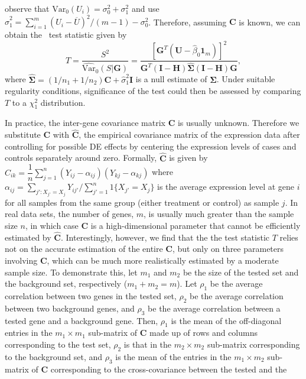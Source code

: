 	observe
	that $\mbox{Var}_{0}(U_i)=\sigma_0^2+\sigma_1^2$ and use
	$\hat\sigma_1^2=\sum_{i=1}^m(U_i-\overline{U})^2/(m-1)-\sigma_0^2$. Therefore, assuming $\bm C$ 
	is
	known, we can obtain the \OurMethod~test statistic given by
	\begin{equation}\label{eq:meqleastat}
	T = \dfrac{S^2}{\widehat{\mbox{Var}}_{0}(S|\bm G)} = \dfrac{[\bm G^T(\bm U-\hat\beta_0\bm
		1_m)]^2}{\bm G^T(\bm I-\bm H)\hat{\bm\Sigma}(\bm I-\bm H)\bm G}, 
	\end{equation}
	where $\hat{\bm\Sigma}=(1/n_1+1/n_2)\bm C+\hat\sigma_1^2\bm I$ is a null estimate of $\bm 
	\Sigma$. Under suitable regularity conditions, significance of the test could then be assessed 
	by comparing $T$ to a $\chi^2_1$ distribution.
	
	
	In practice, the inter-gene covariance matrix $\bm C$ is usually unknown. Therefore we 
	substitute $\bm C$ with $\hat {\bm C}$, the empirical covariance matrix of the expression data 
	after controlling for
	possible DE effects by centering the expression levels of cases and controls separately around
	zero. Formally, $\hat {\bm C}$ is given by $\hat
	C_{ik}=\dfrac{1}{n}\sum_{j=1}^n(Y_{ij}-\alpha_{ij})(Y_{kj}-\alpha_{kj})$ where
	$\alpha_{ij}=\sum_{j':X_{j'}=X_{j}}Y_{ij'}/\sum_{j'=1}^n1\{X_{j'}=X_{j}\}$ is the average 
	expression level at gene $i$ for all samples from the same group (either treatment or control) 
	as sample $j$. In real data sets, the number of genes, $m$, is usually much greater than the 
	sample size $n$, in
	which case $\bm C$ is a high-dimensional parameter that cannot be efficiently estimated by $\hat
	{\bm C}$. Interestingly, however, we find that the the test statistic $T$ relies not on
	the accurate estimation of the entire $\bm C$, but only on three parameters involving $\bm C$, 
	which can be much more realistically estimated by a moderate sample size. To demonstrate this, 
	let $m_1$ and $m_2$ be the size of the tested set and the background set, respectively 
	($m_1+m_2=m$). Let $\rho_1$ be the average correlation between two genes in the tested set, 
	$\rho_2$ be the average correlation between two background genes, and $\rho_3$ be the average 
	correlation between a tested gene and a background gene. Then, $\rho_1$ is the mean of the 
	off-diagonal entries in the $m_1\times m_1$ sub-matrix of $\bm C$ made up of rows and columns 
	corresponding to the test set, $\rho_2$ is that in the $m_2\times m_2$ sub-matrix corresponding 
	to the background set, and $\rho_3$ is the mean of the entries in the $m_1\times m_2$ 
	sub-matrix of $\bm C$ corresponding to the cross-covariance between the tested and the 
